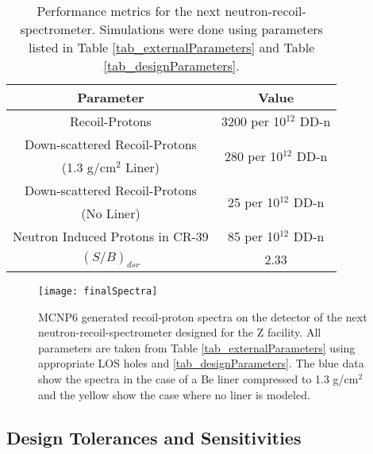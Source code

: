 \begin{table}[!h]
	\caption{Performance metrics for the next neutron-recoil-spectrometer. Simulations were done using parameters listed in Table \ref{tab_externalParameters} and Table \ref{tab_designParameters}.}
	\label{tab_performanceMetrics}
	\renewcommand{\arraystretch}{1.5} 
	\begin{tabular}{  c | c  }
		Parameter & Value \\\hline
		Recoil-Protons & 3200 per 10$^{12}$ DD-n \\ 
		Down-scattered Recoil-Protons & \multirow{2}{*}{280 per 10$^{12}$ DD-n} \\
		(1.3 g/cm$^2$ Liner) &\\
		Down-scattered Recoil-Protons & \multirow{2}{*}{25 per 10$^{12}$ DD-n} \\
		(No Liner) &\\
		Neutron Induced Protons in CR-39 & 85 per 10$^{12}$ DD-n \\
		$(S/B)_{dsr}$ & 2.33 \\
	\end{tabular}		
\end{table}

\begin{figure}[h!]
	
	\centering
	\texttt{[image: finalSpectra]}
	\caption{MCNP6 generated recoil-proton spectra on the detector of the next neutron-recoil-spectrometer designed for the Z facility. All parameters are taken from Table \ref{tab_externalParameters} using appropriate LOS holes and \ref{tab_designParameters}. The blue data show the spectra in the case of a Be liner compressed to 1.3 g/cm$^2$ and the yellow show the case where no liner is modeled.}
	\label{fig_finalSpectra}
	
\end{figure}

\subsection{Design Tolerances and Sensitivities}

